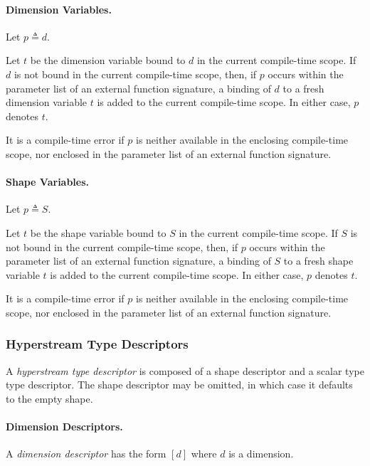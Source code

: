 \documentclass{article}
\begin{document}
 \paragraph{Dimension Variables.}
 
 Let $p \triangleq d$.
 
 Let $t$ be the dimension variable bound to $d$ in the current compile-time scope. If $d$ is not bound in the current compile-time scope, then, if $p$ occurs within the parameter list of an external function signature,  a binding of $d$ to a fresh dimension variable $t$ is added to the current compile-time scope. In either case, $p$ denotes  $t$. 

 
 It is a compile-time error if $p$ is neither available in the enclosing compile-time scope, nor enclosed in the parameter list of an external function signature.
 
 \paragraph{Shape Variables.}


 Let $p \triangleq S$.
 
 Let $t$ be the shape variable bound to  $S$ in the current compile-time scope. If $S$ is not bound in the current compile-time scope, then, if $p$ occurs within the parameter list of an external function signature,  a binding of  $S$ to a fresh shape variable $t$ is added to the current compile-time scope. In either case, $p$ denotes  $t$. 
 
 It is a compile-time error if $p$ is neither available in the enclosing compile-time scope, nor enclosed in the parameter list of an external function signature.
 
\subsubsection{Hyperstream Type Descriptors}
\label{hyperstreamTypeDescriptors}

A {\em hyperstream type descriptor} is composed of a shape descriptor and a scalar type type descriptor. The shape descriptor may be omitted, in which case it defaults to the empty shape. 

\TypeSig{}
\HyperstreamType

\paragraph{Dimension Descriptors.}
A {\em dimension descriptor} has the form $[d]$ where $d$ is a dimension. 
\end{document}
